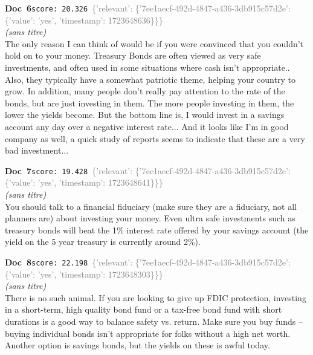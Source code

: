 \documentclass[a4paper,11pt]{article}
\begin{document}
\begin{docenv}
{\footnotesize\textcolor{doccolor}{\textbf{Doc~6}}}\hfill{\tiny\texttt{score:~20.326}}\ {\tiny\textcolor{gray}{\{'relevant': \{'7ee1aecf-492d-4847-a436-3db915c57d2e': \{'value': 'yes', 'timestamp': 1723648636\}\}\}}}\\[3pt]
{\small\textit{(sans titre)}}\\[2pt]
\vspace{2pt}
{\footnotesize 
The only reason I can think of would be if you were convinced that you couldn't hold on to your money. Treasury Bonds are often viewed as very safe investments, and often used in some situations where cash isn't appropriate.. Also, they typically have a somewhat patriotic theme, helping your country to grow. In addition, many people don't really pay attention to the rate of the bonds, but are just investing in them. The more people investing in them, the lower the yields become. But the bottom line is, I would invest in a savings account any day over a negative interest rate... And it looks like I'm in good company as well, a quick study of reports seems to indicate that these are a very bad investment...}
\end{docenv}
\begin{docenv}
{\footnotesize\textcolor{doccolor}{\textbf{Doc~7}}}\hfill{\tiny\texttt{score:~19.428}}\ {\tiny\textcolor{gray}{\{'relevant': \{'7ee1aecf-492d-4847-a436-3db915c57d2e': \{'value': 'yes', 'timestamp': 1723648641\}\}\}}}\\[3pt]
{\small\textit{(sans titre)}}\\[2pt]
\vspace{2pt}
{\footnotesize 
You should talk to a financial fiduciary (make sure they are a fiduciary, not all planners are) about investing your money.  Even ultra safe investments such as treasury bonds will beat the 1\% interest rate offered by your savings account (the yield on the 5 year treasury is currently around 2\%).}
\end{docenv}
\begin{docenv}
{\footnotesize\textcolor{doccolor}{\textbf{Doc~8}}}\hfill{\tiny\texttt{score:~22.198}}\ {\tiny\textcolor{gray}{\{'relevant': \{'7ee1aecf-492d-4847-a436-3db915c57d2e': \{'value': 'yes', 'timestamp': 1723648303\}\}\}}}\\[3pt]
{\small\textit{(sans titre)}}\\[2pt]
\vspace{2pt}
{\footnotesize 
There is no such animal. If you are looking to give up FDIC protection, investing in a short-term, high quality bond fund or a tax-free bond fund with short durations is a good way to balance safety vs. return. Make sure you buy funds -- buying individual bonds isn't appropriate for folks without a high net worth. Another option is savings bonds, but the yields on these is awful today.}
\end{docenv}
\end{document}
